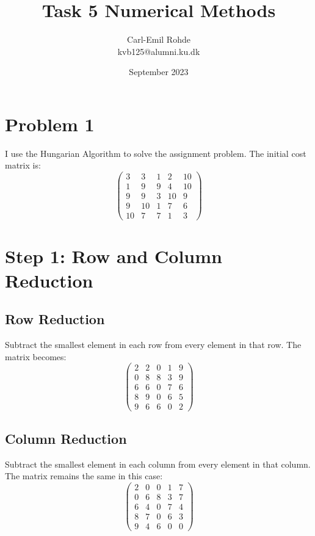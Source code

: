 \documentclass[manuscript,screen,review]{acmart}
\begin{document}
\title{Task 5  Numerical Methods}
\author{Carl-Emil Rohde \\ kvb125@alumni.ku.dk}
\date{September 2023}

\maketitle

\section*{Problem 1}
I use the Hungarian Algorithm to solve the assignment problem. The initial cost matrix is:
\[
\begin{pmatrix}
3 & 3 & 1 & 2 & 10 \\
1 & 9 & 9 & 4 & 10 \\
9 & 9 & 3 & 10 & 9 \\
9 & 10 & 1 & 7 & 6 \\
10 & 7 & 7 & 1 & 3
\end{pmatrix}
\]

\section*{Step 1: Row and Column Reduction}

\subsection*{Row Reduction}
Subtract the smallest element in each row from every element in that row. The matrix becomes:
\[
\begin{pmatrix}
2 & 2 & 0 & 1 & 9 \\
0 & 8 & 8 & 3 & 9 \\
6 & 6 & 0 & 7 & 6 \\
8 & 9 & 0 & 6 & 5 \\
9 & 6 & 6 & 0 & 2
\end{pmatrix}
\]

\subsection*{Column Reduction}
Subtract the smallest element in each column from every element in that column. The matrix remains the same in this case:
\[
\begin{pmatrix}
2 & 0 & 0 & 1 & 7 \\
0 & 6 & 8 & 3 & 7 \\
6 & 4 & 0 & 7 & 4 \\
8 & 7 & 0 & 6 & 3 \\
9 & 4 & 6 & 0 & 0
\end{pmatrix}
\]
\end{document}

